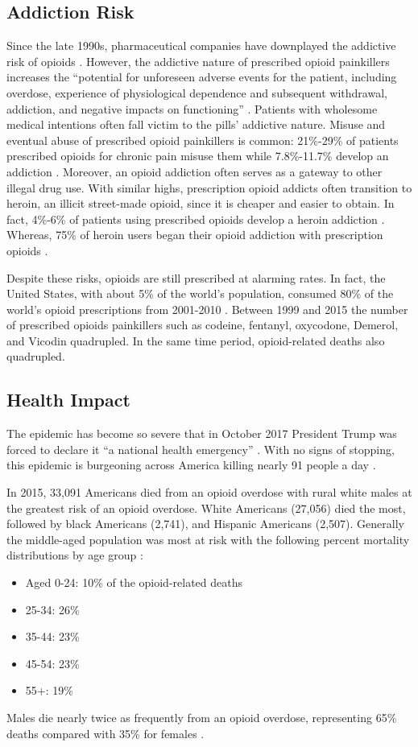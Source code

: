 \documentclass[sigconf]{acmart}
\begin{document}
\subsection{Addiction Risk}
Since the late 1990s, pharmaceutical companies have downplayed the addictive risk of opioids \cite{opsis1}. However, the addictive nature of prescribed opioid painkillers increases the ``potential for unforeseen adverse events for the patient, including overdose, experience of physiological dependence and subsequent withdrawal, addiction, and negative impacts on functioning'' \cite{Vowles01}. Patients with wholesome medical intentions often fall victim to the pills' addictive nature. Misuse and eventual abuse of prescribed opioid painkillers is common: 21\%-29\% of patients prescribed opioids for chronic pain misuse them while 7.8\%-11.7\% develop an addiction \cite{Vowles01}. Moreover, an opioid addiction often serves as a gateway to other illegal drug use. With similar highs, prescription opioid addicts often transition to heroin, an illicit street-made opioid, since it is cheaper and easier to obtain. In fact, 4\%-6\% of patients using prescribed opioids develop a heroin addiction \cite{opsis1}. Whereas, 75\% of heroin users began their opioid addiction with prescription opioids \cite{Cicero01}.

Despite these risks, opioids are still prescribed at alarming rates. In fact, the United States, with about 5\% of the world's population, consumed 80\% of the world's opioid prescriptions from 2001-2010 \cite{Vowles01}. Between 1999 and 2015 the number of prescribed opioids painkillers such as codeine, fentanyl, oxycodone, Demerol, and Vicodin quadrupled. In the same time period, opioid-related deaths also quadrupled.
 
\subsection{Health Impact}
The epidemic has become so severe that in October 2017 President Trump was forced to declare it ``a national health emergency'' \cite{opsis3}. With no signs of stopping, this epidemic is burgeoning across America killing nearly 91 people a day \cite{opsis10}.
 
In 2015, 33,091 Americans died from an opioid overdose with rural white males at the greatest risk of an opioid overdose.  White Americans (27,056) died the most, followed by black Americans (2,741), and Hispanic Americans (2,507). Generally the middle-aged population was most at risk with the following percent mortality distributions by age group \cite{opsis4}:
\begin{itemize}
\item Aged 0-24: 10\% of the opioid-related deaths
\item 25-34: 26\% 
\item 35-44: 23\% 
\item 45-54: 23\% 
\item 55+: 19\% 
\end{itemize}
Males die nearly twice as frequently from an opioid overdose, representing 65\% deaths compared with 35\% for females \cite{opsis4}.
\end{document}
